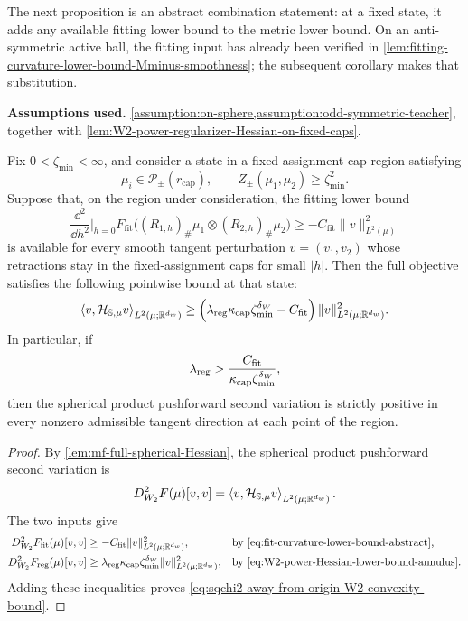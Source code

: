 The next proposition is an abstract combination statement: at a fixed state,
it adds any available fitting lower bound to the metric lower bound.  On an
anti-symmetric active ball, the fitting input has already been verified in
\cref{lem:fitting-curvature-lower-bound-Mminus-smoothness}; the subsequent
corollary makes that substitution.

\begin{proposition}
\label{prop:sqchi2-away-from-origin-Wasserstein-convexity}
\textbf{Assumptions used.} \cref{assumption:on-sphere,assumption:odd-symmetric-teacher}, together with \cref{lem:W2-power-regularizer-Hessian-on-fixed-caps}.

Fix \(0<\zeta_{\min}<\infty\), and consider a state in a fixed-assignment
cap region satisfying
\[
    \mu_i\in\mathcal P_\pm(r_{\mathrm{cap}}),
    \qquad
    Z_\pm(\mu_1,
    \mu_2)
    \ge
    \zeta_{\min}^2.
\]
Suppose that, on the region under consideration, the fitting lower bound
\begin{equation}
\label{eq:fit-curvature-lower-bound-abstract}
    \frac{\dd^2}{\dd h^2}\Big|_{h=0}
    F_{\mathrm{fit}}\bigl((R_{1,h})_\#\mu_1\otimes(R_{2,h})_\#\mu_2\bigr)
    \ge
    -C_{\mathrm{fit}}\|v\|_{L^2(\mu)}^2
\end{equation}
is available for every smooth tangent perturbation \(v=(v_1,v_2)\) whose
retractions stay in the fixed-assignment caps for small \(|h|\).  Then the
full objective satisfies the following pointwise bound at that state:
\begin{equation}
\label{eq:sqchi2-away-from-origin-W2-convexity-bound}
    \left\langle v,\mathcal H_{\mathbb{S},\mu}v\right\rangle_{L^2(\mu;\mathbb R^{d_w})}
    \ge
    \left(
        \lambda_{\mathrm{reg}}\kappa_{\mathrm{cap}}\zeta_{\min}^{\delta_W}
        -C_{\mathrm{fit}}
    \right)
    \|v\|_{L^2(\mu;\mathbb R^{d_w})}^2.
\end{equation}
In particular, if
\[
    \lambda_{\mathrm{reg}}>
    \frac{C_{\mathrm{fit}}}{\kappa_{\mathrm{cap}}\zeta_{\min}^{\delta_W}},
\]
then the spherical product pushforward second variation is strictly positive in
every nonzero admissible tangent direction at each point of the region.
\end{proposition}

\begin{proof}
By \cref{lem:mf-full-spherical-Hessian}, the spherical product pushforward
second variation is
\[
 D_{W_2}^2F(\mu)[v,v]
 =\left\langle v,\mathcal H_{\mathbb{S},\mu}v\right\rangle_{L^2(\mu;\mathbb R^{d_w})}.
\]
The two inputs give
\begin{align*}
 D_{W_2}^2F_{\mathrm{fit}}(\mu)[v,v]
 &\ge -C_{\mathrm{fit}}\|v\|_{L^2(\mu;\mathbb R^{d_w})}^2,
 &&\text{by \cref{eq:fit-curvature-lower-bound-abstract},}\\
 D_{W_2}^2F_{\mathrm{reg}}(\mu)[v,v]
 &\ge \lambdaReg\kappa_{\mathrm{cap}}\zeta_{\min}^{\delta_W}
        \|v\|_{L^2(\mu;\mathbb R^{d_w})}^2,
 &&\text{by \cref{eq:W2-power-Hessian-lower-bound-annulus}.}
\end{align*}
Adding these inequalities proves
\cref{eq:sqchi2-away-from-origin-W2-convexity-bound}.
\end{proof}

